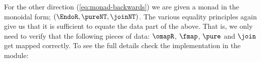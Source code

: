%
For the other direction (\ref{eq:monad-backwards}) we are given a
monad in the monoidal form; $(\EndoR, \pureNT, \joinNT)$.  The various
equality principles again give us that it is sufficient to equate the
data part of the above.  That is, we only need to verify that the
following pieces of data: $\omapR$, $\fmap$, $\pure$ and $\join$ get
mapped correctly.  To see the full details check the implementation in
the module:
%
\begin{center}
\end{center}
